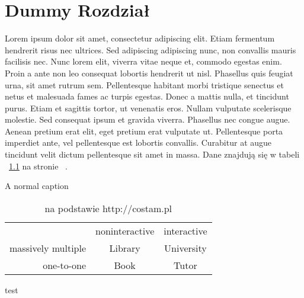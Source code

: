 \chapter{Dummy Rozdział}
Lorem ipsum dolor sit amet, consectetur adipiscing elit. Etiam fermentum hendrerit risus nec ultrices. Sed adipiscing adipiscing nunc, non convallis mauris facilisis nec. Nunc lorem elit, viverra vitae neque et, commodo egestas enim. Proin a ante non leo consequat lobortis hendrerit ut nisl. Phasellus quis feugiat urna, sit amet rutrum sem. Pellentesque habitant morbi tristique senectus et netus et malesuada fames ac turpis egestas. Donec a mattis nulla, et tincidunt purus. Etiam et sagittis tortor, ut venenatis eros. Nullam vulputate scelerisque molestie. Sed consequat ipsum et gravida viverra. Phasellus nec congue augue. Aenean pretium erat elit, eget pretium erat vulputate ut. Pellentesque porta imperdiet ante, vel pellentesque est lobortis convallis. Curabitur at augue tincidunt velit dictum pellentesque sit amet in massa. Dane znajdują się w tabeli ~\ref{tabela:testowa} na stronie ~\pageref{tabela:testowa}.
\begin{table}[h] %
	\caption{A normal caption}
	\begin{tabular}{ r|c|c| }
		\multicolumn{1}{r}{}
 		&  \multicolumn{1}{c}{noninteractive}
 		& \multicolumn{1}{c}{interactive} \\
		\cline{2-3}
		massively multiple & Library & University \\
		\cline{2-3}
		one-to-one & Book & Tutor \\
		\cline{2-3}
	\end{tabular}
	\caption*{na podstawie http://costam.pl}
	\label{tabela:testowa}
\end{table}
test \cite{abramowitz+stegun}